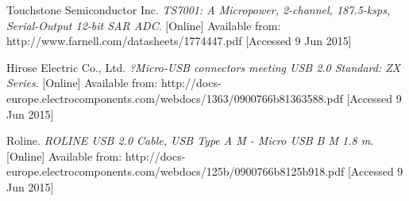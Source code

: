\begin{thebibliography}{99}
Touchstone Semiconductor Inc. \textit{TS7001: A Micropower, 2-channel, 187.5-ksps, Serial-Output 12-bit SAR ADC}. [Online] Available from: http://www.farnell.com/datasheets/1774447.pdf [Accessed 9 Jun 2015]

Hirose Electric Co., Ltd. \textit{?Micro-USB connectors meeting USB 2.0 Standard: ZX Series}. [Online] Available from: http://docs-europe.electrocomponents.com/webdocs/1363/0900766b81363588.pdf [Accessed 9 Jun 2015]

Roline. \textit{ROLINE USB 2.0 Cable, USB Type A M - Micro USB B M 1.8 m}. [Online] Available from: http://docs-europe.electrocomponents.com/webdocs/125b/0900766b8125b918.pdf [Accessed 9 Jun 2015]

\end{thebibliography}